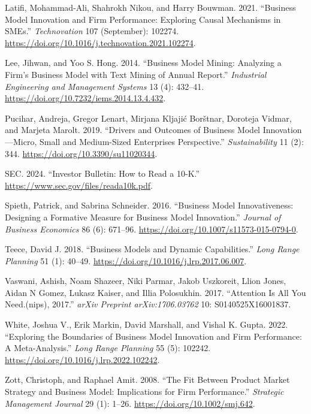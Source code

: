 \documentclass[
]{article}
\newlength{\cslhangindent}
\newenvironment{CSLReferences}[2] %
 {\begin{list}{}{%
  \setlength{\itemindent}{0pt}
  \setlength{\leftmargin}{0pt}
  \setlength{\parsep}{0pt}
  \ifodd #1
   \setlength{\leftmargin}{\cslhangindent}
   \setlength{\itemindent}{-1\cslhangindent}
  \fi
  \setlength{\itemsep}{#2\baselineskip}}}
 {\end{list}}
\begin{document}
\begin{CSLReferences}{1}{0}
Latifi, Mohammad-Ali, Shahrokh Nikou, and Harry Bouwman. 2021.
{``Business Model Innovation and Firm Performance: {Exploring} Causal
Mechanisms in {SMEs}.''} \emph{Technovation} 107 (September): 102274.
\url{https://doi.org/10.1016/j.technovation.2021.102274}.

Lee, Jihwan, and Yoo S. Hong. 2014. {``Business {Model} {Mining}:
{Analyzing} a {Firm}'s {Business} {Model} with {Text} {Mining} of
{Annual} {Report}.''} \emph{Industrial Engineering and Management
Systems} 13 (4): 432--41.
\url{https://doi.org/10.7232/iems.2014.13.4.432}.

Pucihar, Andreja, Gregor Lenart, Mirjana Kljajić Borštnar, Doroteja
Vidmar, and Marjeta Marolt. 2019. {``Drivers and {Outcomes} of
{Business} {Model} {Innovation}---{Micro}, {Small} and {Medium}-{Sized}
{Enterprises} {Perspective}.''} \emph{Sustainability} 11 (2): 344.
\url{https://doi.org/10.3390/su11020344}.

SEC. 2024. {``Investor {Bulletin}: {How} to {Read} a 10-{K}.''}
\url{https://www.sec.gov/files/reada10k.pdf}.

Spieth, Patrick, and Sabrina Schneider. 2016. {``Business Model
Innovativeness: Designing a Formative Measure for Business Model
Innovation.''} \emph{Journal of Business Economics} 86 (6): 671--96.
\url{https://doi.org/10.1007/s11573-015-0794-0}.

Teece, David J. 2018. {``Business Models and Dynamic Capabilities.''}
\emph{Long Range Planning} 51 (1): 40--49.
\url{https://doi.org/10.1016/j.lrp.2017.06.007}.

Vaswani, Ashish, Noam Shazeer, Niki Parmar, Jakob Uszkoreit, Llion
Jones, Aidan N Gomez, Lukasz Kaiser, and Illia Polosukhin. 2017.
{``Attention Is All You Need.(nips), 2017.''} \emph{arXiv Preprint
arXiv:1706.03762} 10: S0140525X16001837.

White, Joshua V., Erik Markin, David Marshall, and Vishal K. Gupta.
2022. {``Exploring the Boundaries of Business Model Innovation and Firm
Performance: {A} Meta-Analysis.''} \emph{Long Range Planning} 55 (5):
102242. \url{https://doi.org/10.1016/j.lrp.2022.102242}.

Zott, Christoph, and Raphael Amit. 2008. {``The Fit Between Product
Market Strategy and Business Model: Implications for Firm
Performance.''} \emph{Strategic Management Journal} 29 (1): 1--26.
\url{https://doi.org/10.1002/smj.642}.

\end{CSLReferences}
\end{document}
